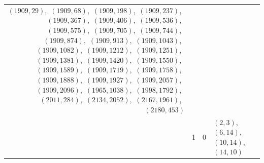 \documentclass[11pt]{article}
\begin{document}
\begin{longtable}{@{}rrl>{\raggedright\arraybackslash}p{}@{}}
$(1909,29)$,\allowbreak\ $(1909,68)$,\allowbreak\ $(1909,198)$,\allowbreak\ $(1909,237)$,\allowbreak\ $(1909,367)$,\allowbreak\ $(1909,406)$,\allowbreak\ $(1909,536)$,\allowbreak\ $(1909,575)$,\allowbreak\ $(1909,705)$,\allowbreak\ $(1909,744)$,\allowbreak\ $(1909,874)$,\allowbreak\ $(1909,913)$,\allowbreak\ $(1909,1043)$,\allowbreak\ $(1909,1082)$,\allowbreak\ $(1909,1212)$,\allowbreak\ $(1909,1251)$,\allowbreak\ $(1909,1381)$,\allowbreak\ $(1909,1420)$,\allowbreak\ $(1909,1550)$,\allowbreak\ $(1909,1589)$,\allowbreak\ $(1909,1719)$,\allowbreak\ $(1909,1758)$,\allowbreak\ $(1909,1888)$,\allowbreak\ $(1909,1927)$,\allowbreak\ $(1909,2057)$,\allowbreak\ $(1909,2096)$,\allowbreak\ $(1965,1038)$,\allowbreak\ $(1998,1792)$,\allowbreak\ $(2011,284)$,\allowbreak\ $(2134,2052)$,\allowbreak\ $(2167,1961)$,\allowbreak\ $(2180,453)$\\
\addlinespace[3pt]
17 & 1 & $0$ & $(2,3)$,\allowbreak\ $(6,14)$,\allowbreak\ $(10,14)$,\allowbreak\ $(14,10)$\\

\end{longtable}
\end{document}

